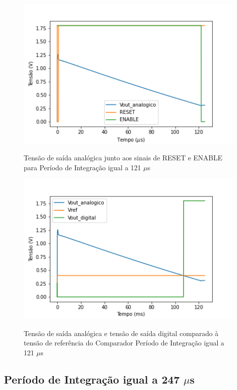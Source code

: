 \begin{figure}[htb]
 \centering
    \centering
    \caption{Tensão de saída analógica junto aos sinais de RESET e ENABLE para Período de Integração igual a 121 $\mu$s}
    \includegraphics[scale=0.5]{Resultados/Graficos/reseteenable-tb_pixel125.png}
    \label{graf125}
\end{figure}

\begin{figure}[htb]
 \centering
    \caption{Tensão de saída analógica e tensão de saída digital comparado à tensão de referência do Comparador Período de Integração igual a 121 $\mu$s} 
    \includegraphics[scale=0.5]{Resultados/Graficos/analogicoedigital-tb_pixel125.png}
    \label{graf1252}
\end{figure}

\subsection{Período de Integração igual a 247 $\mu$s}

